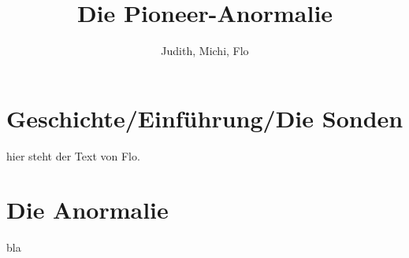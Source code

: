 \documentclass[a4paper,10pt]{article}
\title{Die Pioneer-Anormalie}
\author{Judith, Michi, Flo}
\begin{document}
\maketitle

% 

\section{Geschichte/Einführung/Die Sonden}
hier steht der Text von Flo.

\section{Die Anormalie}
bla
\end{document}

